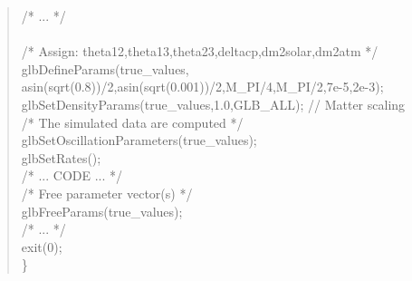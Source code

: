{\begin{quote}
{{  \hspace*{0.5cm} /* ... */ \\
\\  
 \hspace*{0.5cm} /* Assign: theta12,theta13,theta23,deltacp,dm2solar,dm2atm */ \\
   \hspace*{0.5cm}  
     glbDefineParams(true\_values,\\
     \hspace*{1.5cm}asin(sqrt(0.8))/2,asin(sqrt(0.001))/2,M\_PI/4,M\_PI/2,7e-5,2e-3); \\
    \hspace*{0.5cm}
     glbSetDensityParams(true\_values,1.0,GLB\_ALL); // Matter scaling \\
     
     \hspace*{0.5cm}  
   /* The simulated data are computed */ \\
   \hspace*{0.5cm} glbSetOscillationParameters(true\_values); \\
   \hspace*{0.5cm} glbSetRates(); \\
   
  \hspace*{0.5cm} /* ... CODE ... */ \\
  
\hspace*{0.5cm}  /* Free parameter vector(s) */ \\
\hspace*{0.5cm}  glbFreeParams(true\_values); \\
\hspace*{0.5cm} /* ... */ \\
 
  \hspace*{0.5cm}   exit(0); \\
\} 
}}
\end{quote}

}

